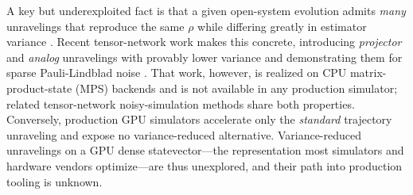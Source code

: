 \documentclass{ieeeaccess}
\begin{document}
A key but underexploited fact is that a given open-system evolution admits \emph{many}
unravelings that reproduce the same $\rho$ while differing greatly in estimator variance
\cite{breuer_petruccione,daley2014}. Recent tensor-network work \cite{tjm2026} makes this
concrete, introducing \emph{projector} and \emph{analog} unravelings with provably lower
variance and demonstrating them for sparse Pauli-Lindblad noise
\cite{sparse_pauli_lindblad2023}. That work, however, is realized on CPU
matrix-product-state (MPS) backends \cite{vidal2003,cirac2021mps} and is not available in any
production simulator; related tensor-network noisy-simulation methods
\cite{lpdo2023,mpdo_prr,mpdo_tomography2025,noh2020} share both properties. Conversely,
production GPU simulators \cite{qiskit_aer,cuquantum2023} accelerate only the \emph{standard}
trajectory unraveling and expose no variance-reduced alternative. Variance-reduced
unravelings on a GPU dense statevector---the representation most simulators and hardware
vendors optimize---are thus unexplored, and their path into production tooling is unknown.
\end{document}
